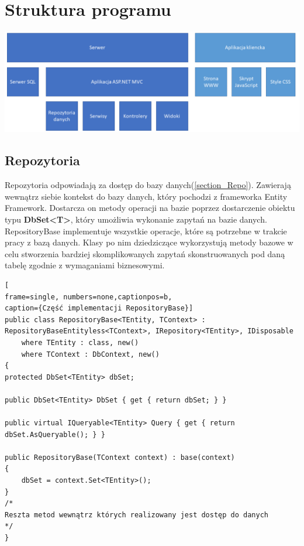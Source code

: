 \section{Struktura programu}

\begin{center}
	\includegraphics[width=\textwidth]{images/Structure.png}
\end{center}


\subsection{Repozytoria}

Repozytoria odpowiadają za dostęp do bazy danych(\ref{section_Repo}). Zawierają wewnątrz siebie kontekst do bazy danych, który pochodzi z frameworka Entity Framework. Dostarcza on metody operacji na bazie poprzez dostarczenie obiektu typu \textbf{DbSet<T>}, który umożliwia wykonanie zapytań na bazie danych. RepositoryBase implementuje wszystkie operacje, które są potrzebne w trakcie pracy z bazą danych. Klasy po nim dziedziczące wykorzystują metody bazowe w celu stworzenia bardziej skomplikowanych zapytań skonstruowanych pod daną tabelę zgodnie z wymaganiami biznesowymi. 

\begin{minipage}{\linewidth}
\begin{lstlisting}[
frame=single, numbers=none,captionpos=b, 
caption={Część implementacji RepositoryBase}]
public class RepositoryBase<TEntity, TContext> : RepositoryBaseEntityless<TContext>, IRepository<TEntity>, IDisposable
	where TEntity : class, new()
	where TContext : DbContext, new()
{
protected DbSet<TEntity> dbSet;

public DbSet<TEntity> DbSet { get { return dbSet; } }

public virtual IQueryable<TEntity> Query { get { return dbSet.AsQueryable(); } }

public RepositoryBase(TContext context) : base(context)
{
	dbSet = context.Set<TEntity>();
}
/*
Reszta metod wewnątrz których realizowany jest dostęp do danych
*/
}
\end{lstlisting}
\end{minipage}

